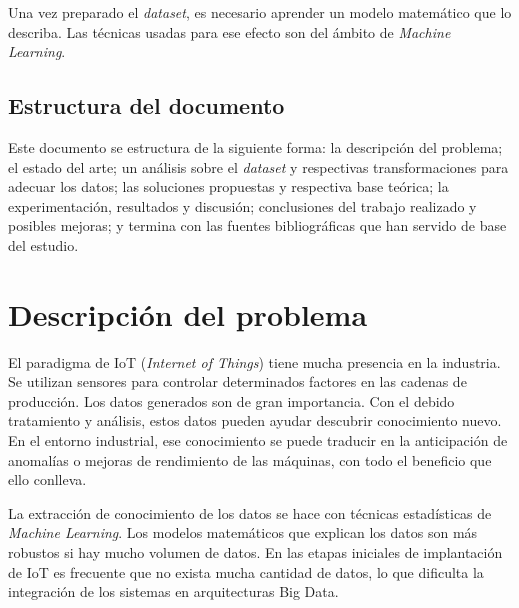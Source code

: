 \documentclass[11pt,spanish,listoffigures,listoftables]{tfgetsinf}
\begin{document}
Una vez preparado el {\em dataset}, es necesario aprender un modelo matemático que lo describa. Las técnicas usadas para ese efecto son del ámbito de {\em Machine Learning}. 

    
    \section{Estructura del documento}
    
    Este documento se estructura de la siguiente forma: la descripción del problema; el estado del arte; un análisis sobre el {\em dataset} y respectivas transformaciones para adecuar los datos; las soluciones propuestas y respectiva base teórica; la experimentación, resultados y discusión; conclusiones del trabajo realizado y posibles mejoras; y termina con las fuentes bibliográficas que han servido de base del estudio.


\chapter{Descripción del problema}
El paradigma de IoT ({\em Internet of Things}) tiene mucha presencia en la industria. Se utilizan sensores para controlar determinados factores en las cadenas de producción. Los datos generados son de gran importancia. Con el debido tratamiento y análisis, estos datos pueden ayudar descubrir conocimiento nuevo. En el entorno industrial, ese conocimiento se puede traducir en la anticipación de anomalías o mejoras de rendimiento de las máquinas, con todo el beneficio que ello conlleva.

La extracción de conocimiento de los datos se hace con técnicas estadísticas de {\em Machine Learning}. Los modelos matemáticos que explican los datos son más robustos si hay mucho volumen de datos. En las etapas iniciales de implantación de IoT es frecuente que no exista mucha cantidad de datos, lo que dificulta la integración de los sistemas en arquitecturas Big Data.
\end{document}

